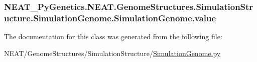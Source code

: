 \subsubsection[{\texorpdfstring{value}{value}}]{\setlength{\rightskip}{0pt plus 5cm}N\+E\+A\+T\+\_\+\+Py\+Genetics.\+N\+E\+A\+T.\+Genome\+Structures.\+Simulation\+Structure.\+Simulation\+Genome.\+Simulation\+Genome.\+value\hspace{0.3cm}{\ttfamily [static]}}\hypertarget{classNEAT__PyGenetics_1_1NEAT_1_1GenomeStructures_1_1SimulationStructure_1_1SimulationGenome_1_1SimulationGenome_a27b218236fdf7a6526bdddef382a38e9}{}\label{classNEAT__PyGenetics_1_1NEAT_1_1GenomeStructures_1_1SimulationStructure_1_1SimulationGenome_1_1SimulationGenome_a27b218236fdf7a6526bdddef382a38e9}


The documentation for this class was generated from the following file\+:\begin{DoxyCompactItemize}
\item 
N\+E\+A\+T/\+Genome\+Structures/\+Simulation\+Structure/\hyperlink{SimulationGenome_8py}{Simulation\+Genome.\+py}\end{DoxyCompactItemize}
